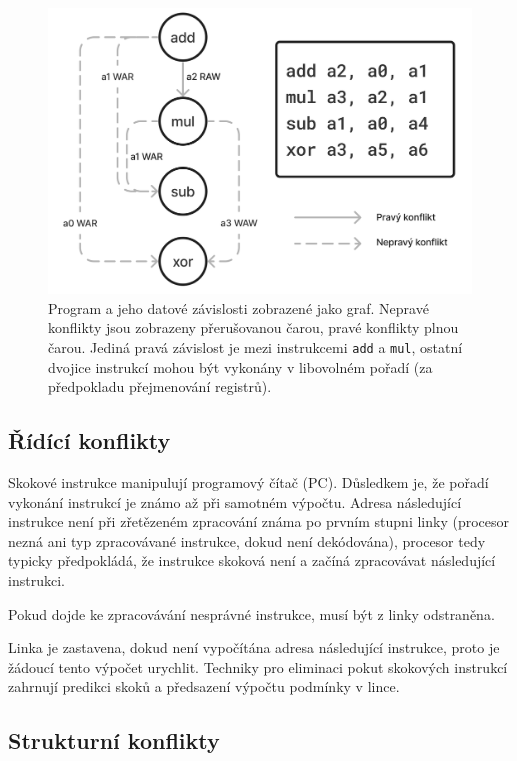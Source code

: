\begin{figure}[ht]\centering
  \centering
  \includegraphics[width=13cm]{obrazky-figures/dataconflicts.png}
  \caption{Program a jeho datové závislosti zobrazené jako graf. Nepravé konflikty jsou zobrazeny přerušovanou čarou, pravé konflikty plnou čarou. Jediná pravá závislost je mezi instrukcemi \texttt{add} a \texttt{mul}, ostatní dvojice instrukcí mohou být vykonány v libovolném pořadí (za předpokladu přejmenování registrů).}
  \label{dataconflicts}
\end{figure}

\subsection{Řídící konflikty}

Skokové instrukce manipulují programový čítač (PC).
Důsledkem je, že pořadí vykonání instrukcí je známo až při samotném výpočtu.
Adresa následující instrukce není při zřetězeném zpracování známa po prvním stupni linky (procesor nezná ani typ zpracovávané instrukce, dokud není dekódována), procesor tedy typicky předpokládá, že instrukce skoková není a začíná zpracovávat následující instrukci.

Pokud dojde ke zpracovávání nesprávné instrukce, musí být z linky odstraněna.

Linka je zastavena, dokud není vypočítána adresa následující instrukce, proto je žádoucí tento výpočet urychlit.
Techniky pro eliminaci pokut skokových instrukcí zahrnují predikci skoků a předsazení výpočtu podmínky v lince.

\subsection{Strukturní konflikty}

